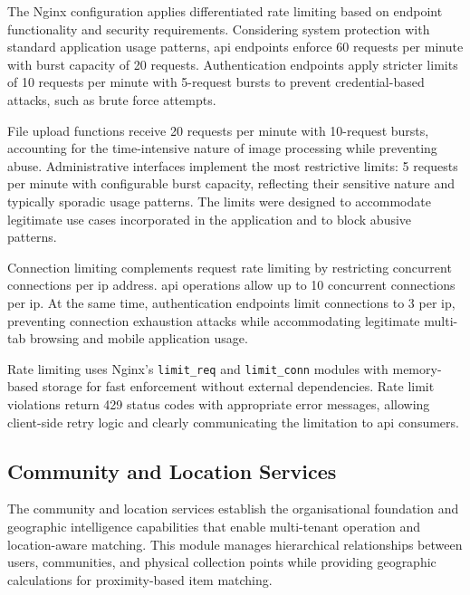 The Nginx configuration applies differentiated rate limiting based on endpoint functionality and security requirements. Considering system protection with standard application usage patterns, \ac{api} endpoints enforce 60 requests per minute with burst capacity of 20 requests. Authentication endpoints apply stricter limits of 10 requests per minute with 5-request bursts to prevent credential-based attacks, such as brute force attempts.

File upload functions receive 20 requests per minute with 10-request bursts, accounting for the time-intensive nature of image processing while preventing abuse. Administrative interfaces implement the most restrictive limits: 5 requests per minute with configurable burst capacity, reflecting their sensitive nature and typically sporadic usage patterns. The limits were designed to accommodate legitimate use cases incorporated in the application and to block abusive patterns.

Connection limiting complements request rate limiting by restricting concurrent connections per \ac{ip} address. \ac{api} operations allow up to 10 concurrent connections per \ac{ip}. At the same time, authentication endpoints limit connections to 3 per \ac{ip}, preventing connection exhaustion attacks while accommodating legitimate multi-tab browsing and mobile application usage.

Rate limiting uses Nginx's \texttt{limit\_req} and \texttt{limit\_conn} modules with memory-based storage for fast enforcement without external dependencies. Rate limit violations return 429 status codes with appropriate error messages, allowing client-side retry logic and clearly communicating the limitation to \ac{api} consumers.


\subsection{Community and Location Services} \label{subsection:community_location_services}

The community and location services establish the organisational foundation and geographic intelligence capabilities that enable multi-tenant operation and location-aware matching. This module manages hierarchical relationships between users, communities, and physical collection points while providing geographic calculations for proximity-based item matching.

